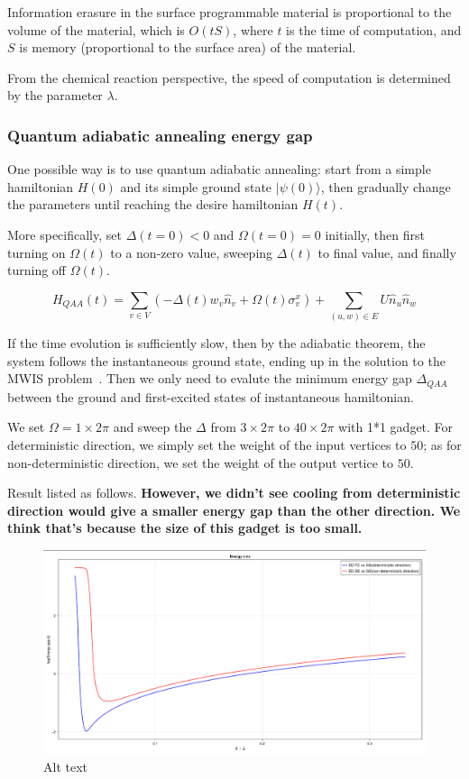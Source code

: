 \documentclass[twocolumn,superscriptaddress,english,showpacs,longbibliography]{revtex4-2}
\begin{document}
Information erasure in the surface programmable material is proportional
to the volume of the material, which is $O(tS)$, where $t$ is the
time of computation, and $S$ is memory (proportional to the surface
area) of the material.

From the chemical reaction perspective, the speed of computation is
determined by the parameter $\lambda$.

\subsubsection{Quantum adiabatic annealing energy gap}\label{quantum-adiabatic-annealing-energy-gap}

One possible way is to use quantum adiabatic annealing: start from a
simple hamiltonian $H(0)$ and its simple ground state
$|\psi(0)\rangle$, then gradually change the parameters until reaching
the desire hamiltonian $H(t)$.

More specifically, set $\Delta(t=0) <0$ and $\Omega(t=0) =0$
initially, then first turning on $\Omega(t)$ to a non-zero value,
sweeping $\Delta(t)$ to final value, and finally turning off
$\Omega(t)$.

\begin{equation}
H_{QAA}(t) = \sum_{v\in V} (-\Delta(t)w_v \hat n_v + \Omega(t)\sigma_{v}^x) + \sum_{(u,w) \in E} U\hat n_u \hat n_w
\end{equation}

If the time evolution is sufficiently slow, then by the adiabatic
theorem, the system follows the instantaneous ground state, ending up in
the solution to the MWIS problem~\cite{Pichler2018}.
Then we only need to evalute
the minimum energy gap $\Delta_{QAA}$ between the ground and
first-excited states of instantaneous hamiltonian.

We set $\Omega = 1 \times 2\pi$ and sweep the $\Delta$ from $3
\times 2\pi$ to $40 \times 2\pi$ with 1*1 gadget. For deterministic
direction, we simply set the weight of the input vertices to $50$; as
for non-deterministic direction, we set the weight of the output vertice
to $50$.

Result listed as follows. \textbf{However, we didn't see cooling from
deterministic direction would give a smaller energy gap than the other
direction. We think that's because the size of this gadget is too
small.}

\begin{figure}
\centering
\includegraphics[width=\columnwidth]{../notes/images/energy_gap_1_gadget.png}
\caption{Alt text}
\end{figure}
\end{document}
